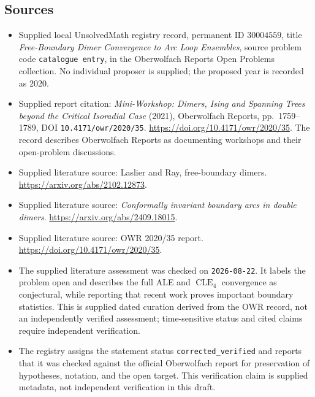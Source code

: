 \documentclass[11pt]{article}
\begin{document}
\subsection{Sources}
\begin{itemize}
\item Supplied local UnsolvedMath registry record, permanent ID \(30004559\), title \emph{Free-Boundary Dimer Convergence to Arc Loop Ensembles}, source problem code \texttt{catalogue entry}, in the Oberwolfach Reports Open Problems collection. No individual proposer is supplied; the proposed year is recorded as 2020.
\item Supplied report citation: \emph{Mini-Workshop: Dimers, Ising and Spanning Trees beyond the Critical Isoradial Case} (2021), Oberwolfach Reports, pp.\ 1759--1789, DOI \texttt{10.4171/owr/2020/35}. \url{https://doi.org/10.4171/owr/2020/35}. The record describes Oberwolfach Reports as documenting workshops and their open-problem discussions.
\item Supplied literature source: Laslier and Ray, free-boundary dimers. \url{https://arxiv.org/abs/2102.12873}.
\item Supplied literature source: \emph{Conformally invariant boundary arcs in double dimers}. \url{https://arxiv.org/abs/2409.18015}.
\item Supplied literature source: OWR 2020/35 report. \url{https://doi.org/10.4171/owr/2020/35}.
\item The supplied literature assessment was checked on \texttt{2026-08-22}. It labels the problem open and describes the full ALE and \(\operatorname{CLE}_4\) convergence as conjectural, while reporting that recent work proves important boundary statistics. This is supplied dated curation derived from the OWR record, not an independently verified assessment; time-sensitive status and cited claims require independent verification.
\item The registry assigns the statement status \texttt{corrected\_verified} and reports that it was checked against the official Oberwolfach report for preservation of hypotheses, notation, and the open target. This verification claim is supplied metadata, not independent verification in this draft.
\end{itemize}
\end{document}
